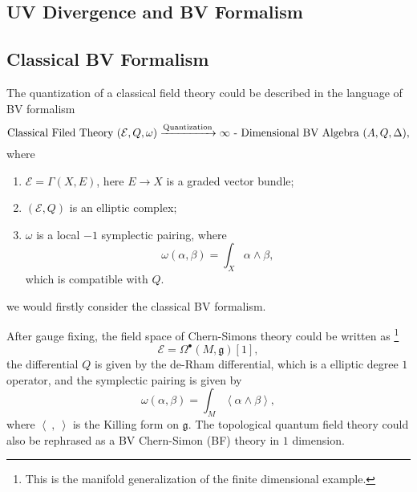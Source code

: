 \documentclass[10pt]{article}
\begin{document}
\subsection{UV Divergence and BV Formalism}

\subsection{Classical BV Formalism}

The quantization of a classical field theory could be described in the language of BV formalism
\begin{equation*}
  \text{Classical Filed Theory $(\mathcal{E}, Q, \omega)$} \xrightarrow{\text{Quantization}} \text{$ \infty $ - Dimensional BV Algebra $(A, Q, \Delta)$},
\end{equation*}
where
\begin{enumerate}[(1)]
  \item $ \mathcal{E} = \Gamma(X, E)$, here $ E \rightarrow X$ is a graded vector bundle;
  \item $\left( \mathcal{E}, Q \right)$ is an elliptic complex;
  \item $ \omega$ is a local $-1$ symplectic pairing, where
    \begin{equation*}
      \omega(\alpha, \beta) = \int _{X} \alpha \wedge \beta,
    \end{equation*}
    which is compatible with $ Q$.
\end{enumerate}
we would firstly consider the classical BV formalism.

\begin{example}
  After gauge fixing, the field space of Chern-Simons theory could be written as \footnote{This is the manifold generalization of the finite dimensional example.}
  \begin{equation*}
    \mathcal{E} = \Omega^{\bullet}(M, \mathfrak{g})[1],
  \end{equation*}
  the differential $ Q$ is given by the de-Rham differential, which is a elliptic degree $ 1$ operator, and the symplectic pairing is given by
  \begin{equation*}
    \omega(\alpha, \beta) = \int _{M} \left< \alpha \wedge \beta \right>,
  \end{equation*}
  where $\left< ~,~ \right>$ is the Killing form on $ \mathfrak{g}$.
  The topological quantum field theory could also be rephrased as a BV Chern-Simon (BF) theory in $ 1$ dimension.
\end{example}
\end{document}
